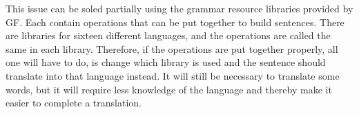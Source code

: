This issue can be soled partially using the grammar resource libraries provided by GF. Each contain operations that can be put together to build sentences. There are libraries for sixteen different languages, and the operations are called the same in each library. Therefore, if the operations are put together properly, all one will have to do, is change which library is used and the sentence should translate into that language instead. It will still be necessary to translate some words, but it will require less knowledge of the language and thereby make it easier to complete a translation.